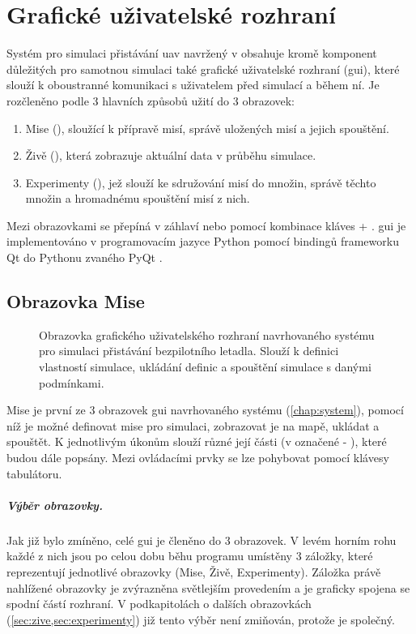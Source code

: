 \chapter{Grafické uživatelské rozhraní} \label{chap:gui}
    Systém pro simulaci přistávání \acrshort{uav} navržený v  obsahuje kromě komponent důležitých pro samotnou simulaci také grafické uživatelské rozhraní (\acrshort{gui}), které slouží k oboustranné komunikaci s uživatelem před simulací a během ní. Je rozčleněno podle 3 hlavních způsobů užití do 3 obrazovek:
    \begin{enumerate}
        \item Mise (), sloužící k přípravě misí, správě uložených misí a jejich spouštění.
        \item Živě (), která zobrazuje aktuální data v průběhu simulace.
        \item Experimenty (), jež slouží ke sdružování misí do množin, správě těchto množin a hromadnému spouštění misí z nich.
    \end{enumerate}
    Mezi obrazovkami se přepíná v záhlaví nebo pomocí kombinace kláves \Ctrl + \Tab. \acrshort{gui} je implementováno v programovacím jazyce Python pomocí bindingů frameworku Qt do Pythonu zvaného PyQt \cite{pyqt}.
    \section{Obrazovka Mise} \label{sec:mise}
    \begin{figure}
        \centering
        
        \caption[GUI: Obrazovka ]{Obrazovka  grafického uživatelského rozhraní navrhovaného systému pro simulaci přistávání bezpilotního letadla. Slouží k definici vlastností simulace, ukládání definic a spouštění simulace s danými podmínkami.}
        \label{fig:tabMise}
    \end{figure}
    Mise je první ze 3 obrazovek \acrshort{gui} navrhovaného systému (\cref{chap:system}), pomocí níž je možné definovat mise pro simulaci, zobrazovat je na mapě, ukládat a spouštět. K jednotlivým úkonům slouží různé její části (v  označené  - ), které budou dále popsány. Mezi ovládacími prvky se lze pohybovat pomocí klávesy tabulátoru.
    \paragraph{ Výběr obrazovky.}Jak již bylo zmíněno, celé \acrshort{gui} je členěno do 3 obrazovek. V levém horním rohu každé z nich jsou po celou dobu běhu programu umístěny 3 záložky, které reprezentují jednotlivé obrazovky (Mise, Živě, Experimenty). Záložka právě nahlížené obrazovky je zvýrazněna světlejším provedením a je graficky spojena se spodní částí rozhraní. V podkapitolách o dalších obrazovkách (\cref*{sec:zive,sec:experimenty}) již tento výběr není zmiňován, protože je společný.

